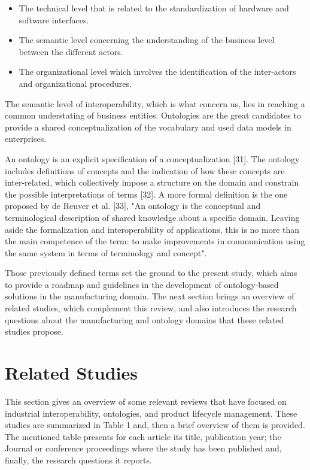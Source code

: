 \documentclass[peerreview]{IEEEtran}
\begin{document}
\begin{itemize}
\item The technical level that is related to the standardization of hardware and software interfaces. 
\item The semantic level concerning the understanding of the business level between the different actors. 
\item The organizational level which involves the identification of the inter-actors and organizational procedures. 
\end{itemize}

The semantic level of interoperability, which is what concern us, lies in reaching a common understating of business entities. Ontologies are the great candidates to provide a shared conceptualization of the vocabulary and used data models in enterprises. 


An ontology is an explicit specification of a conceptualization \cite{}[31]. The ontology includes definitions of concepts and the indication of how these concepts are inter-related, which collectively impose a structure on the domain and constrain the possible interpretations of terms \cite{}[32]. A more formal definition is the one proposed by de Reuver et al.  \cite{}[33], "An ontology is the conceptual and terminological description of shared knowledge about a specific domain. Leaving aside the formalization and interoperability of applications, this is no more than the main competence of the term: to make improvements in communication using the same system in terms of terminology and concept". 


Those previously defined terms set the ground to the present study, which aims to provide a roadmap and guidelines in the development of ontology-based solutions in the manufacturing domain. The next section brings an overview of related studies, which complement this review, and also introduces the research questions about the manufacturing and ontology domains that these related studies propose.

\section{Related Studies}

This section gives an overview of some relevant reviews that have focused on industrial interoperability, ontologies, and product lifecycle management. These studies are summarized in Table 1 and, then a brief overview of them is provided. The mentioned table presents for each article its title, publication year; the Journal or conference proceedings where the study has been published and, finally, the research questions it reports. 
\end{document}
